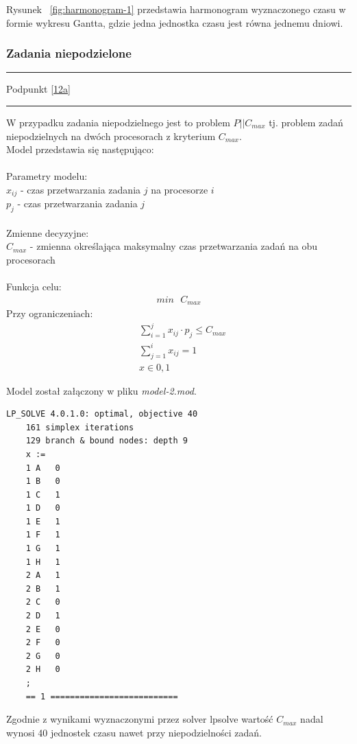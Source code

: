\documentclass[
    12pt, %
]{../fphw}
\begin{document}
Rysunek ~\ref{fig:harmonogram-1} przedstawia harmonogram wyznaczonego czasu
w formie wykresu Gantta, gdzie jedna jednostka czasu jest równa jednemu dniowi.

\subsubsection{Zadania niepodzielone}
\par\noindent\rule{\textwidth}{0.4pt}
    Podpunkt \ref{12a}
\par\noindent\rule{\textwidth}{0.4pt}
W przypadku zadania niepodzielnego jest to problem \(P||C_{max}\) 
tj. problem zadań niepodzielnych na dwóch procesorach z kryterium \(C_{max}\). \\
Model przedstawia się następująco: \\ \\
Parametry modelu: \\
\(x_{ij}\) - czas przetwarzania zadania \(j\) na procesorze \(i\) \\
\(p_j\) - czas przetwarzania zadania \(j\) \\ \\
Zmienne decyzyjne: \\
\(C_{max}\) - zmienna określająca maksymalny czas przetwarzania zadań na obu procesorach \\ \\
Funkcja celu: \\
\begin{align*}
    min \text{ } C_{max}
\end{align*}
\newpage
Przy ograniczeniach: \\
\begin{align*}
    & \sum^j_{i=1}x_{ij} \cdot p_j \leq C_{max} \\
    & \sum^i_{j=1}x_{ij} = 1 \\
    & x \in  {0,1}
\end{align*}


Model został załączony w pliku \textit{model-2.mod}.

\begin{lstlisting}[caption=Rozwiązanie znalezione solwerem lpsolve]
    LP_SOLVE 4.0.1.0: optimal, objective 40
    161 simplex iterations
    129 branch & bound nodes: depth 9
    x :=
    1 A   0
    1 B   0
    1 C   1
    1 D   0
    1 E   1
    1 F   1
    1 G   1
    1 H   1
    2 A   1
    2 B   1
    2 C   0
    2 D   1
    2 E   0
    2 F   0
    2 G   0
    2 H   0
    ;
    == 1 ==========================
\end{lstlisting}
Zgodnie z wynikami wyznaczonymi przez solver lpsolve wartość \(C_{max}\) nadal wynosi 40 jednostek czasu
nawet przy niepodzielności zadań.
\end{document}
